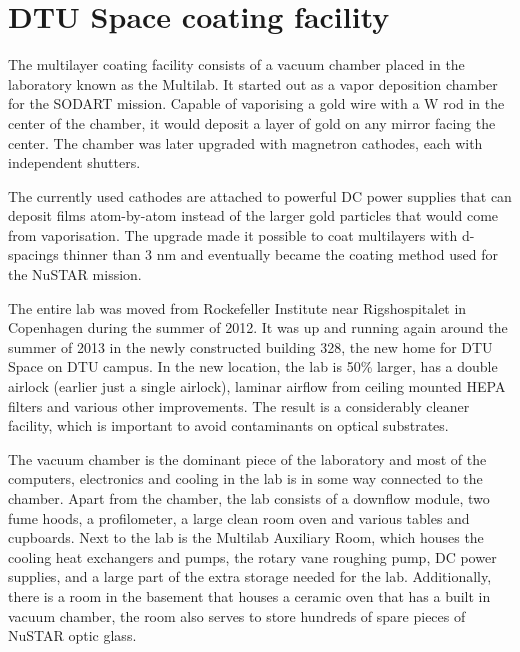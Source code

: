 \chapter{DTU Space coating facility}\label{chap:coating_facility}

The multilayer coating facility consists of a vacuum chamber placed in the laboratory known as the Multilab. It started out as a vapor deposition chamber for the SODART mission\cite{Christensen:1997kk,Schnopper:1994ip}. Capable of vaporising a gold wire with a W rod in the center of the chamber, it would deposit a layer of gold on any mirror facing the center. The chamber was later upgraded with magnetron cathodes, each with independent shutters.

The currently used cathodes are attached to powerful DC power supplies that can deposit films atom-by-atom instead of the larger gold particles that would come from vaporisation. The upgrade made it possible to coat multilayers with d-spacings thinner than 3 nm and eventually became the coating method used for the NuSTAR mission.

The entire lab was moved from Rockefeller Institute near Rigshospitalet in Copenhagen during the summer of 2012. It was up and running again around the summer of 2013 in the newly constructed building 328, the new home for DTU Space on DTU campus. In the new location, the lab is 50\% larger, has a double airlock (earlier just a single airlock), laminar airflow from ceiling mounted HEPA filters and various other improvements. The result is a considerably cleaner facility, which is important to avoid contaminants on optical substrates.

The vacuum chamber is the dominant piece of the laboratory and most of the computers, electronics and cooling in the lab is in some way connected to the chamber. Apart from the chamber, the lab consists of a downflow module, two fume hoods, a profilometer, a large clean room oven and various tables and cupboards. Next to the lab is the Multilab Auxiliary Room, which houses the cooling heat exchangers and pumps, the rotary vane roughing pump, DC power supplies, and a large part of the extra storage needed for the lab. Additionally, there is a room in the basement that houses a ceramic oven that has a built in vacuum chamber, the room also serves to store hundreds of spare pieces of NuSTAR optic glass.

